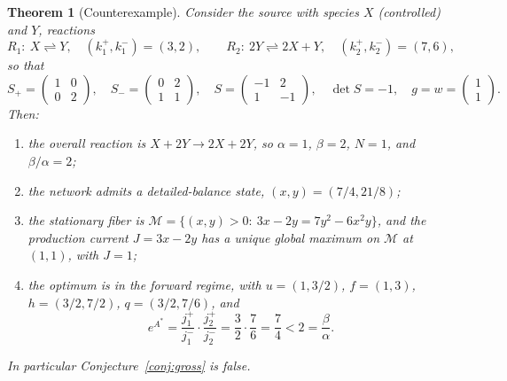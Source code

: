 \documentclass[11pt,reqno]{amsart}
\theoremstyle{plain}
\newtheorem{theorem}{Theorem}[section]
\theoremstyle{definition}
\theoremstyle{remark}
\numberwithin{equation}{section}
\newcommand{\Sp}{S_{+}}
\newcommand{\Sm}{S_{-}}
\begin{document}
\begin{theorem}[Counterexample]\label{thm:oa2x2}
Consider the source with species $X$ (controlled) and $Y$, reactions
\[
R_1:\ X\rightleftharpoons Y,\quad(k^+_1,k^-_1)=(3,2),\qquad R_2:\ 2Y\rightleftharpoons 2X+Y,\quad(k^+_2,k^-_2)=(7,6),
\]
so that
\[
\Sp=\begin{pmatrix}1&0\\0&2\end{pmatrix},\quad\Sm=\begin{pmatrix}0&2\\1&1\end{pmatrix},\quad S=\begin{pmatrix}-1&2\\1&-1\end{pmatrix},\quad \det S=-1,\quad g=w=\begin{pmatrix}1\\1\end{pmatrix}.
\]
Then:
\begin{enumerate}[label=(\roman*)]
\item the overall reaction is $X+2Y\to2X+2Y$, so $\alpha=1$, $\beta=2$, $N=1$, and $\beta/\alpha=2$;
\item the network admits a detailed-balance state, $(x,y)=(7/4,21/8)$;
\item the stationary fiber is $\mathcal M=\{(x,y)>0:\ 3x-2y=7y^2-6x^2y\}$, and the production current $J=3x-2y$ has a unique global maximum on $\mathcal M$ at $(1,1)$, with $J=1$;
\item the optimum is in the forward regime, with $u=(1,3/2)$, $f=(1,3)$, $h=(3/2,7/2)$, $q=(3/2,7/6)$, and
\[
e^{A^*}=\frac{j^+_1}{j^-_1}\cdot\frac{j^+_2}{j^-_2}=\frac32\cdot\frac76=\frac74<2=\frac\beta\alpha .
\]
\end{enumerate}
In particular Conjecture~\ref{conj:gross} is false.
\end{theorem}
\end{document}
